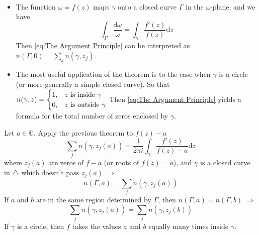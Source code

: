 \begin{remark}
    \, 
    \begin{itemize}
        \item The function  $ \omega=f(z) $ maps  $ \gamma $ onto a closed curve  $ \Gamma $ in the  $ \omega $-plane, and we have 
        \begin{equation}
            \int_\Gamma\frac{\mathrm{d}\omega}{\omega}=\int_\gamma\frac{f'(z)}{f(z)}\mathrm{d}z
        \end{equation}    
        Then \eqref{eq:The Argument Principle} can be interpreted as  $ n(\Gamma,0)=\sum\limits_jn(\gamma,z_j) $.
        \item The most useful application of the theorem is to the case when  $ \gamma $ is a circle (or more generally a simple closed curve). So that \\ $\displaystyle n(\gamma,z)=\begin{cases}
            1,&z\text{ is inside }\gamma \\
            0,&z\text{ is outside }\gamma
        \end{cases} $   
        Then \eqref{eq:The Argument Principle} yields a formula for the total number of zeros enclosed by  $ \gamma $. 
    \end{itemize}
\end{remark}
Let  $ a\in \mathbb{C} $. Apply the previous theorem to  $ f(z)-a $
\[\sum_jn(\gamma,z_j(a))=\frac{1}{2\pi i}\int_\gamma\frac{f'(z)}{f(z)-a}\mathrm{d}z\]
where  $ z_j(a) $ are zeros of  $ f-a $ (or roots of  $ f(z)=a $), and  $ \gamma $ is a closed curve in  $ \triangle $ which doesn't pass  $ z_j(a) $  $ \Rightarrow $
\[n(\Gamma,a)=\sum_jn(\gamma,z_j(a))\]
If  $ a $ and  $ b $ are in the same region determined by  $ \Gamma $, then  $ n(\Gamma,a)=n(\Gamma,b) $ $ \Rightarrow $
\begin{equation}
    \sum_jn(\gamma,z_j(a))=\sum_jn(\gamma,z_j(b))
\end{equation}      
If  $ \gamma $ is a circle, then  $ f $ takes the values  $ a $ and  $ b $ equally many times inside  $ \gamma $.    